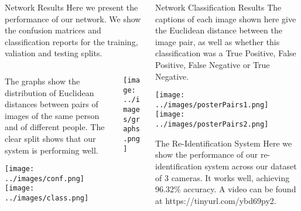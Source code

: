 \documentclass[final]{beamer}
\begin{document}
\begin{frame}{}
\begin{columns}[t]
\begin{column}{.5\linewidth}
        \begin{block}{Network Results}
        Here we present the performance of our network. We show the confusion matrices and classification reports for the training, valiation and testing splits. 
		    \begin{columns}[t]
		    
				\begin{column}{.45\linewidth}
				
				The graphs show the distribution of Euclidean distances between pairs of images of the same person and of different people. The clear split shows that our system is performing well.
				
				\vspace{1cm}
				\texttt{[image: ../images/conf.png]}  
				\vspace{.5cm}
			 	\texttt{[image: ../images/class.png]}
			 	  
				\end{column}
		
				\begin{column}{.45\linewidth}
				
					\texttt{[image: ../images/graphs.png]}
					  
				\end{column}
			\end{columns}
        \end{block}
        
        
    
    
	 \end{column}
	 \begin{column}{.5\linewidth}
 		
 		\begin{block}{Network Classification Results}
        The captions of each image shown here give the Euclidean distance between the image pair, as well as whether this classification was a True Positive, False Positive, False Negative or True Negative. 
        
 		\texttt{[image: ../images/posterPairs1.png]}  
 		\hspace{.1cm}
 		\texttt{[image: ../images/posterPairs2.png]} 
 		
        \end{block}
        
        \begin{block}{The Re-Identification System}
        Here we show the performance of our re-identification system across our dataset of 3 cameras. It works well, achieving 96.32\% accuracy. A video can be found at https://tinyurl.com/ybd69py2.
       

\end{block}
\end{column}
\end{columns}
\end{frame}
\end{document}
